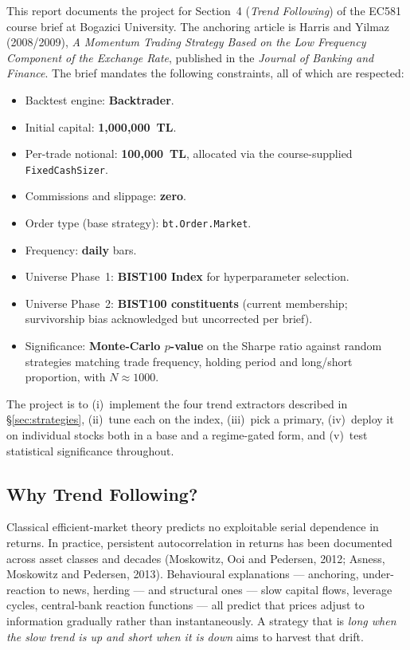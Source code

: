 \documentclass[11pt,a4paper]{article}
\begin{document}
This report documents the project for Section~4 (\emph{Trend Following}) of the
EC581 course brief at Bogazici University. The anchoring article is Harris and
Yilmaz (2008/2009), \emph{A Momentum Trading Strategy Based on the Low Frequency
Component of the Exchange Rate}, published in the \emph{Journal of Banking and
Finance}. The brief mandates the following constraints, all of which are
respected:

\begin{itemize}[leftmargin=1.2em,itemsep=2pt]
    \item Backtest engine: \textbf{Backtrader}.
    \item Initial capital: \textbf{1{,}000{,}000~TL}.
    \item Per-trade notional: \textbf{100{,}000~TL}, allocated via the
          course-supplied \texttt{FixedCashSizer}.
    \item Commissions and slippage: \textbf{zero}.
    \item Order type (base strategy): \texttt{bt.Order.Market}.
    \item Frequency: \textbf{daily} bars.
    \item Universe Phase~1: \textbf{BIST100 Index} for hyperparameter selection.
    \item Universe Phase~2: \textbf{BIST100 constituents} (current membership;
          survivorship bias acknowledged but uncorrected per brief).
    \item Significance: \textbf{Monte-Carlo $p$-value} on the Sharpe ratio
          against random strategies matching trade frequency, holding period and
          long/short proportion, with $N\!\approx\!1000$.
\end{itemize}

The project is to (i)~implement the four trend extractors described in
\S\ref{sec:strategies}, (ii)~tune each on the index, (iii)~pick a primary,
(iv)~deploy it on individual stocks both in a base and a regime-gated form, and
(v)~test statistical significance throughout.

\subsection{Why Trend Following?}

Classical efficient-market theory predicts no exploitable serial dependence in
returns. In practice, persistent autocorrelation in returns has been documented
across asset classes and decades (Moskowitz, Ooi and Pedersen, 2012; Asness,
Moskowitz and Pedersen, 2013). Behavioural explanations --- anchoring,
under-reaction to news, herding --- and structural ones --- slow capital flows,
leverage cycles, central-bank reaction functions --- all predict that prices
adjust to information gradually rather than instantaneously. A strategy that is
\emph{long when the slow trend is up and short when it is down} aims to harvest
that drift.
\end{document}
